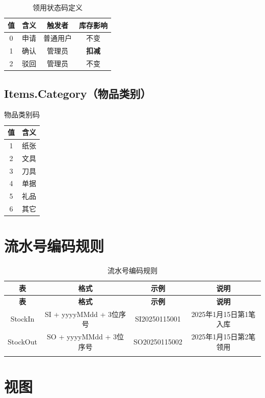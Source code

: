 \documentclass[12pt,a4paper]{ctexart}
\begin{document}
\begin{table}[h]
\centering
\begin{tabular}{c|c|c|c}
\toprule
\textbf{值} & \textbf{含义} & \textbf{触发者} & \textbf{库存影响} \\
\midrule
0 & 申请 & 普通用户 & 不变 \\
1 & 确认 & 管理员   & \cellcolor{red!20}\textbf{扣减} \\
2 & 驳回 & 管理员   & 不变 \\
\bottomrule
\end{tabular}
\caption{领用状态码定义}
\end{table}

\subsection{Items.Category（物品类别）}

\begin{table}[h]
\centering
\begin{tabular}{c|c}
\toprule
\textbf{值} & \textbf{含义} \\
\midrule
1 & 纸张 \\
2 & 文具 \\
3 & 刀具 \\
4 & 单据 \\
5 & 礼品 \\
6 & 其它 \\
\bottomrule
\end{tabular}
\caption{物品类别码}
\end{table}

\section{流水号编码规则}

\begin{longtable}{c|c|c|c}
\toprule
\textbf{表} & \textbf{格式} & \textbf{示例} & \textbf{说明} \\
\midrule
\endfirsthead
\toprule
\textbf{表} & \textbf{格式} & \textbf{示例} & \textbf{说明} \\
\midrule
\endhead
StockIn  & SI + yyyyMMdd + 3位序号 & SI20250115001 & 2025年1月15日第1笔入库 \\
StockOut & SO + yyyyMMdd + 3位序号 & SO20250115002 & 2025年1月15日第2笔领用 \\
\bottomrule
\caption{流水号编码规则}
\end{longtable}

\section{视图}
\end{document}
